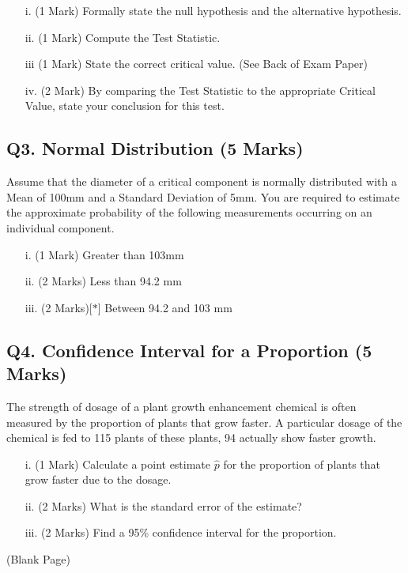 \documentclass[a4paper,12pt]{article}
\begin{document}
\begin{itemize}
	\item[i.] (1 Mark) Formally state the null hypothesis and the alternative hypothesis.
	\item[ii.] (1 Mark) Compute the Test Statistic.
	\item[iii] (1 Mark) State the correct critical value. (See Back of Exam Paper)
	\item[iv.] (2 Mark) By comparing the Test Statistic to the appropriate Critical Value, state your conclusion for this test.
\end{itemize}
\newpage
\subsection*{Q3. Normal Distribution (5 Marks)} %
Assume that the diameter of a critical component is normally distributed with a Mean of 100mm and a Standard Deviation of 5mm. You are required  to estimate the approximate probability of the following measurements occurring on an individual component.
\begin{itemize}
	\item [i.](1 Mark)	Greater than 103mm
	\item [ii.](2 Marks) Less than 94.2 mm
	\item [iii.](2 Marks)[$\ast$] Between 94.2 and 103 mm
\end{itemize}
\bigskip
\newpage

\subsection*{Q4. Confidence Interval for a Proportion (5 Marks)}
The strength of dosage of a plant growth enhancement chemical is often measured by the proportion of plants that grow faster. A particular dosage of the chemical is fed to 115 plants of these plants, 94 actually show faster growth.

\begin{itemize}
	\item[i.] (1 Mark) Calculate a point estimate $\hat{p}$ for the proportion of plants that grow faster due to the dosage. 									 
	\item[ii.] (2 Marks)  What is the standard error of the estimate? 			
	\item[iii.] (2 Marks) Find a 95\% confidence interval for the proportion. 					
\end{itemize}
\newpage
(Blank Page)
\newpage
\end{document}
